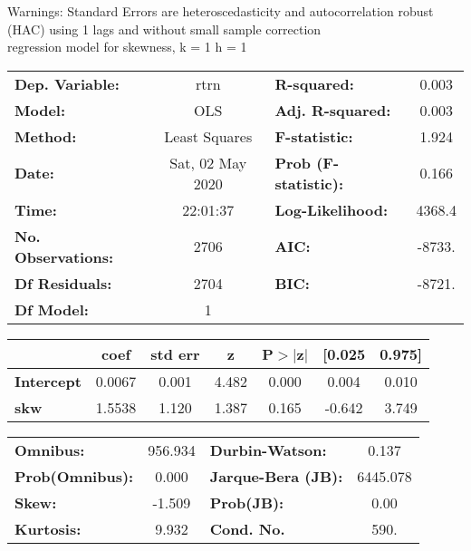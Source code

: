 Warnings: \newline
 [1] Standard Errors are heteroscedasticity and autocorrelation robust (HAC) using 1 lags and without small sample correction\\ 

regression model for skewness, k = 1 h = 1\begin{center}
\begin{tabular}{lclc}
\toprule
\textbf{Dep. Variable:}    &       rtrn       & \textbf{  R-squared:         } &     0.003   \\
\textbf{Model:}            &       OLS        & \textbf{  Adj. R-squared:    } &     0.003   \\
\textbf{Method:}           &  Least Squares   & \textbf{  F-statistic:       } &     1.924   \\
\textbf{Date:}             & Sat, 02 May 2020 & \textbf{  Prob (F-statistic):} &    0.166    \\
\textbf{Time:}             &     22:01:37     & \textbf{  Log-Likelihood:    } &    4368.4   \\
\textbf{No. Observations:} &        2706      & \textbf{  AIC:               } &    -8733.   \\
\textbf{Df Residuals:}     &        2704      & \textbf{  BIC:               } &    -8721.   \\
\textbf{Df Model:}         &           1      & \textbf{                     } &             \\
\bottomrule
\end{tabular}
\begin{tabular}{lcccccc}
                   & \textbf{coef} & \textbf{std err} & \textbf{z} & \textbf{P$> |$z$|$} & \textbf{[0.025} & \textbf{0.975]}  \\
\midrule
\textbf{Intercept} &       0.0067  &        0.001     &     4.482  &         0.000        &        0.004    &        0.010     \\
\textbf{skw}       &       1.5538  &        1.120     &     1.387  &         0.165        &       -0.642    &        3.749     \\
\bottomrule
\end{tabular}
\begin{tabular}{lclc}
\textbf{Omnibus:}       & 956.934 & \textbf{  Durbin-Watson:     } &    0.137  \\
\textbf{Prob(Omnibus):} &   0.000 & \textbf{  Jarque-Bera (JB):  } & 6445.078  \\
\textbf{Skew:}          &  -1.509 & \textbf{  Prob(JB):          } &     0.00  \\
\textbf{Kurtosis:}      &   9.932 & \textbf{  Cond. No.          } &     590.  \\
\bottomrule
\end{tabular}
\end{center}

